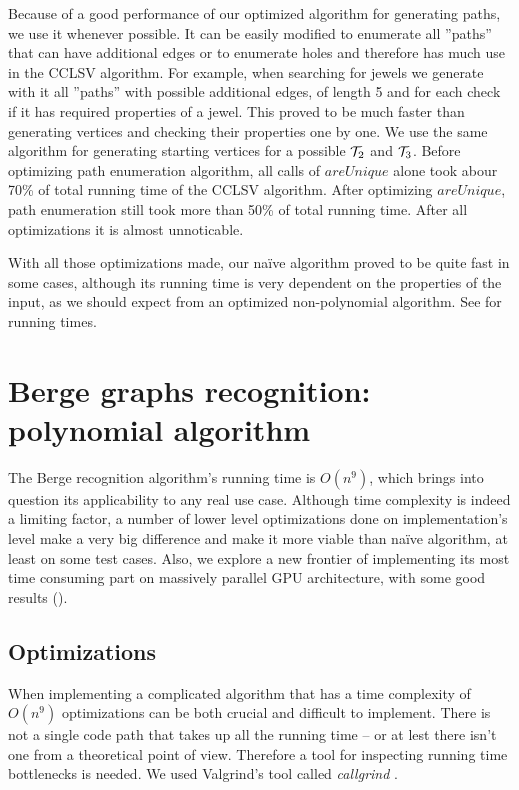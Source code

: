 Because of a good performance of our optimized algorithm for generating paths, we use it whenever possible. It can be easily modified to enumerate all ''paths'' that can have additional edges or to enumerate holes and therefore has much use in the CCLSV algorithm. For example, when searching for jewels we generate with it all ''paths'' with possible additional edges, of length 5 and for each check if it has required properties of a jewel. This proved to be much faster than generating vertices and checking their properties one by one. We use the same algorithm for generating starting vertices for a possible $\mathcal{T}_2$ and $\mathcal{T}_3$. Before optimizing path enumeration algorithm, all calls of $areUnique$ alone took abour 70\% of total running time of the CCLSV algorithm. After optimizing $areUnique$, path enumeration still took more than 50\% of total running time. After all optimizations it is almost unnoticable.

With all those optimizations made, our na\"ive algorithm proved to be quite fast in some cases, although its running time is very dependent on the properties of the input, as we should expect from an optimized non-polynomial algorithm. See  for running times.

\section{Berge graphs recognition: polynomial algorithm}

The Berge recognition algorithm's running time is $O(n^9)$, which brings into question its applicability to any real use case. Although time complexity is indeed a limiting factor, a number of lower level optimizations done on implementation's level make a very big difference and make it more viable than na\"ive algorithm, at least on some test cases. Also, we explore a new frontier of implementing its most time consuming part on massively parallel GPU architecture, with some good results ().

\subsection{Optimizations}
\label{sec:Optimizations}

When implementing a complicated algorithm that has a time complexity of $O(n^9)$ optimizations can be both crucial and difficult to implement. There is not a single code path that takes up all the running time -- or at lest there isn't one from a theoretical point of view. Therefore a tool for inspecting running time bottlenecks is needed. We used Valgrind's tool called \emph{callgrind} \cite{callgrind}.

